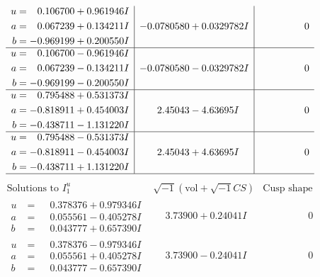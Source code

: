 \documentclass[1p]{elsarticle_modified}
\theoremstyle{definition}
\newcommand{\I}{\sqrt{-1}}
\begin{document}
$$\begin{array}{c|c|c}
\begin{aligned}
u &= \phantom{-}0.106700 + 0.961946 I \\
a &= \phantom{-}0.067239 + 0.134211 I \\
b &= -0.969199 + 0.200550 I\end{aligned}
 & -0.0780580 + 0.0329782 I & \phantom{-0.000000 } 0 \\ \hline\begin{aligned}
u &= \phantom{-}0.106700 - 0.961946 I \\
a &= \phantom{-}0.067239 - 0.134211 I \\
b &= -0.969199 - 0.200550 I\end{aligned}
 & -0.0780580 - 0.0329782 I & \phantom{-0.000000 } 0 \\ \hline\begin{aligned}
u &= \phantom{-}0.795488 + 0.531373 I \\
a &= -0.818911 + 0.454003 I \\
b &= -0.438711 - 1.131220 I\end{aligned}
 & \phantom{-}2.45043 - 4.63695 I & \phantom{-0.000000 } 0 \\ \hline\begin{aligned}
u &= \phantom{-}0.795488 - 0.531373 I \\
a &= -0.818911 - 0.454003 I \\
b &= -0.438711 + 1.131220 I\end{aligned}
 & \phantom{-}2.45043 + 4.63695 I & \phantom{-0.000000 } 0\\
 \hline 
 \end{array}$$\newpage$$\begin{array}{c|c|c}  
\text{Solutions to }I^u_{1}& \I (\text{vol} + \sqrt{-1}CS) & \text{Cusp shape}\\
 \hline 
\begin{aligned}
u &= \phantom{-}0.378376 + 0.979346 I \\
a &= \phantom{-}0.055561 - 0.405278 I \\
b &= \phantom{-}0.043777 + 0.657390 I\end{aligned}
 & \phantom{-}3.73900 + 0.24041 I & \phantom{-0.000000 } 0 \\ \hline\begin{aligned}
u &= \phantom{-}0.378376 - 0.979346 I \\
a &= \phantom{-}0.055561 + 0.405278 I \\
b &= \phantom{-}0.043777 - 0.657390 I\end{aligned}
 & \phantom{-}3.73900 - 0.24041 I & \phantom{-0.000000 } 0 \\ \hline\begin{aligned}

\end{aligned}
\end{array}$$
\end{document}
